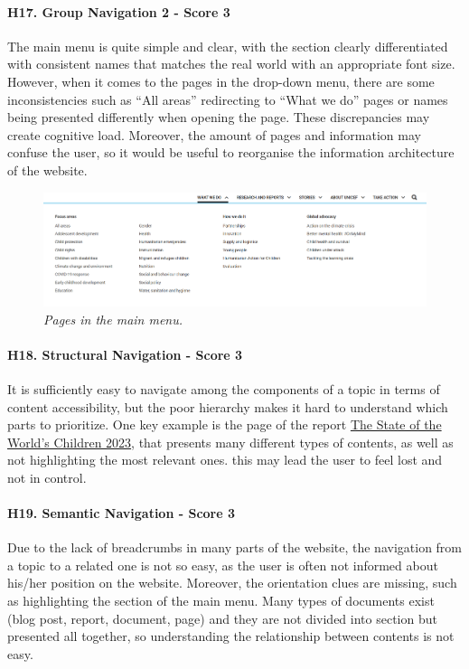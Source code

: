 \paragraph*{H17. Group Navigation 2  - Score 3}
The main menu is quite simple and clear, with the section clearly differentiated with consistent names that matches the real world with an appropriate font size. However, when it comes to the pages in the drop-down menu, there are some inconsistencies such as “All areas” redirecting to “What we do” pages or names being presented differently when opening the page. These discrepancies may create cognitive load. Moreover, the amount of pages and information may confuse the user, so it would be useful to reorganise the information architecture of the website.

\begin{figure}[h]
	\centering
	\begin{center}
		\includegraphics[width=\textwidth]{Picture20.png}
	\end{center}
	\captionsetup{font=small}
	\caption{\textit{Pages in the main menu.}}
	\label{fig:label20}
\end{figure}

\paragraph*{H18. Structural Navigation  - Score 3}
It is sufficiently easy to navigate among the components of a topic in terms of content accessibility, but the poor hierarchy makes it hard to understand which parts to prioritize.
One key example is the page of the report \href{https://www.unicef.org/reports/state-worlds-children-2023}{The State of the World’s Children 2023}, that presents many different types of contents, as well as not highlighting the most relevant ones. this may lead the user to feel lost and not in control.

\paragraph*{H19. Semantic Navigation  - Score 3}
Due to the lack of breadcrumbs in many parts of the website, the navigation from a topic to a related one is not so easy, as the user is often not informed about his/her position on the website. Moreover, the orientation clues are missing, such as highlighting the section of the main menu. Many types of documents exist (blog post, report, document, page) and they are not divided into section but presented all together, so understanding the relationship between contents is not easy.

